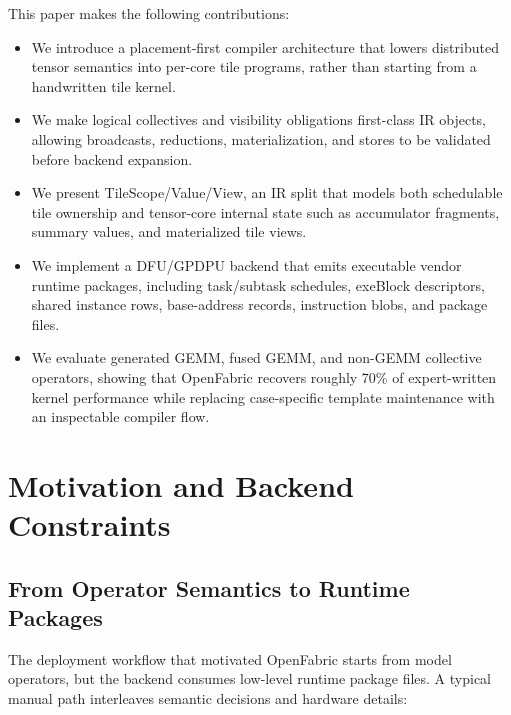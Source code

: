 \documentclass[conference]{IEEEtran}
\newcommand{\systemname}{OpenFabric}
\newcommand{\targetbackend}{DFU/GPDPU}
\newcommand{\expertperf}{70\%}
\begin{document}
This paper makes the following contributions:
\begin{itemize}
\item We introduce a placement-first compiler architecture that lowers
distributed tensor semantics into per-core tile programs, rather than starting
from a handwritten tile kernel.
\item We make logical collectives and visibility obligations first-class IR
objects, allowing broadcasts, reductions, materialization, and stores to be
validated before backend expansion.
\item We present TileScope/Value/View, an IR split that models both schedulable
tile ownership and tensor-core internal state such as accumulator fragments,
summary values, and materialized tile views.
\item We implement a \targetbackend{} backend that emits executable vendor
runtime packages, including task/subtask schedules, exeBlock descriptors, shared
instance rows, base-address records, instruction blobs, and package files.
\item We evaluate generated GEMM, fused GEMM, and non-GEMM collective operators,
showing that \systemname{} recovers roughly \expertperf{} of expert-written
kernel performance while replacing case-specific template maintenance with an
inspectable compiler flow.
\end{itemize}


\section{Motivation and Backend Constraints}

\subsection{From Operator Semantics to Runtime Packages}

The deployment workflow that motivated \systemname{} starts from model
operators, but the backend consumes low-level runtime package files. A typical
manual path interleaves semantic decisions and hardware details:

\begin{center}
\end{center}
\end{document}
